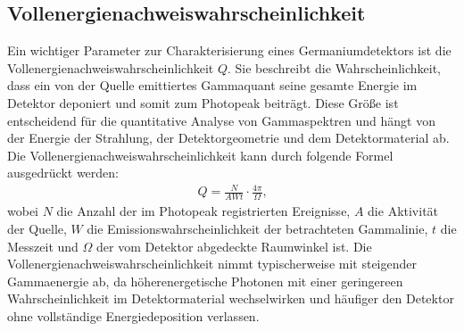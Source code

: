 \subsection{Vollenergienachweiswahrscheinlichkeit}
Ein wichtiger Parameter zur Charakterisierung eines Germaniumdetektors ist die Vollenergienachweiswahrscheinlichkeit $Q$. Sie beschreibt die Wahrscheinlichkeit, dass ein von der Quelle emittiertes Gammaquant seine gesamte Energie im Detektor deponiert und somit zum Photopeak beiträgt. Diese Größe ist entscheidend für die quantitative Analyse von Gammaspektren und hängt von der Energie der Strahlung, der Detektorgeometrie und dem Detektormaterial ab.
Die Vollenergienachweiswahrscheinlichkeit kann durch folgende Formel ausgedrückt werden:
\begin{align}
  Q = \frac{N}{AW t} \cdot \frac{4\pi}{\Omega}\text{,}
\end{align}
wobei $N$ die Anzahl der im Photopeak registrierten Ereignisse, $A$ die Aktivität der Quelle, $W$ die Emissionswahrscheinlichkeit der betrachteten Gammalinie, $t$ die Messzeit und $\Omega$ der vom Detektor abgedeckte Raumwinkel ist.
Die Vollenergienachweiswahrscheinlichkeit nimmt typischerweise mit steigender Gammaenergie ab, da höherenergetische Photonen mit einer geringereen Wahrscheinlichkeit im Detektormaterial wechselwirken und häufiger den Detektor ohne vollständige Energiedeposition verlassen.
